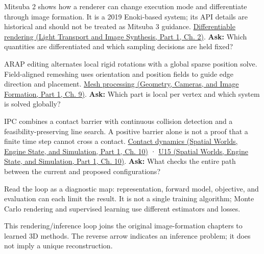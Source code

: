 Mitsuba 2 shows how a renderer can change execution mode and differentiate through image formation. It is a 2019 Enoki-based system; its API details are historical and should not be treated as Mitsuba 3 guidance. \href{../04-Light-Transport-and-Image-Synthesis-P01/main.pdf\#nameddest=03-visual-computing-i-ch007-the-rendering-equation-and-light-transport}{Differentiable rendering (Light Transport and Image Synthesis, Part 1, Ch. 2)}. \textbf{Ask:} Which quantities are differentiated and which sampling decisions are held fixed?

ARAP editing alternates local rigid rotations with a global sparse position solve. Field-aligned remeshing uses orientation and position fields to guide edge direction and placement. \href{../03-Geometry-Cameras-and-Image-Formation-P01/main.pdf\#nameddest=03-visual-computing-i-ch002-meshes-connectivity-and-geometry-processing}{Mesh processing (Geometry, Cameras, and Image Formation, Part 1, Ch. 9)}. \textbf{Ask:} Which part is local per vertex and which system is solved globally?

IPC combines a contact barrier with continuous collision detection and a feasibility-preserving line search. A positive barrier alone is not a proof that a finite time step cannot cross a contact. \href{../05-Spatial-Worlds-Engine-State-and-Simulation-P01/main.pdf\#nameddest=04-visual-computing-ii-ch029-dynamics-forces-and-numerical-integration}{Contact dynamics (Spatial Worlds, Engine State, and Simulation, Part 1, Ch. 10)} · \href{../05-Spatial-Worlds-Engine-State-and-Simulation-P01/main.pdf\#nameddest=04-visual-computing-ii-ch029-figure-u15---the-contact-barrier-grows-near-zero-separation}{U15 (Spatial Worlds, Engine State, and Simulation, Part 1, Ch. 10)}. \textbf{Ask:} What checks the entire path between the current and proposed configurations?


Read the loop as a diagnostic map: representation, forward model, objective, and evaluation can each limit the result. It is not a single training algorithm; Monte Carlo rendering and supervised learning use different estimators and losses.


This rendering/inference loop joins the original image-formation chapters to learned 3D methods. The reverse arrow indicates an inference problem; it does not imply a unique reconstruction.

